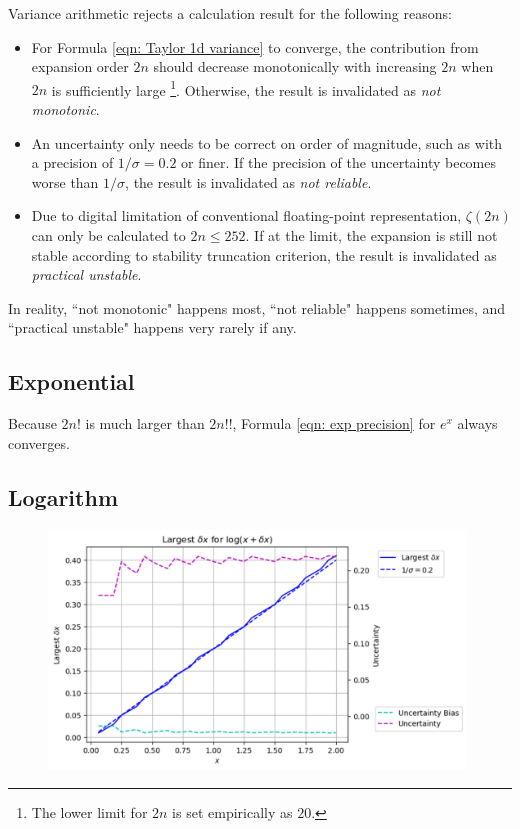 \documentclass[twoside]{article}
\numberwithin{equation}{section}
\begin{document}
Variance arithmetic rejects a calculation result for the following reasons:
\begin{itemize}
\item For Formula \eqref{eqn: Taylor 1d variance} to converge, the contribution from expansion order $2n$ should decrease monotonically with increasing $2n$ when $2n$ is sufficiently large \footnote{The lower limit for $2n$ is set empirically as $20$.}. 
Otherwise, the result is invalidated as \emph{not monotonic}.

\item An uncertainty only needs to be correct on order of magnitude, such as with a precision of $1/\sigma=0.2$ or finer.
If the precision of the uncertainty becomes worse than $1/\sigma$, the result is invalidated as \emph{not reliable}.

\item Due to digital limitation of conventional floating-point representation, $\zeta(2n)$ can only be calculated to $2n \leq 252$.
If at the limit, the expansion is still not stable according to stability truncation criterion, the result is invalidated as \emph{practical unstable}.

\end{itemize}
In reality, ``not monotonic" happens most, ``not reliable" happens sometimes, and ``practical unstable" happens very rarely if any.

\subsection{Exponential}

Because $2n!$ is much larger than $2n!!$, Formula \eqref{eqn: exp precision} for $e^x$ always converges.

\subsection{Logarithm}

\begin{figure}[p]
\centering
\includegraphics[height=2.5in]{Log_Conv_Edge.pdf} 
\label{fig: Log_Conv_Edge}
\end{figure}
\end{document}
